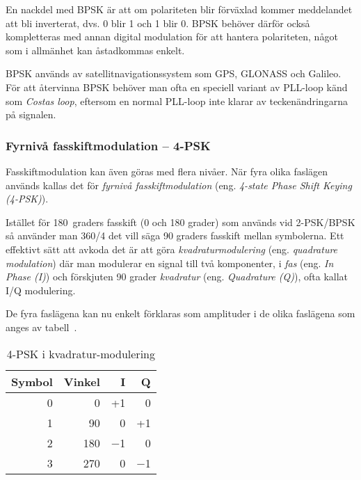 En nackdel med BPSK är att om polariteten blir förväxlad kommer meddelandet
att bli inverterat, dvs. 0 blir 1 och 1 blir 0.
BPSK behöver därför också kompletteras med annan digital modulation för att
hantera polariteten, något som i allmänhet kan åstadkommas enkelt.

BPSK används av satellitnavigationssystem som GPS, GLONASS och Galileo.
För att återvinna BPSK behöver man ofta en speciell variant av PLL-loop känd
som \emph{Costas loop}, eftersom en normal PLL-loop inte klarar av
teckenändringarna på signalen.

\subsubsection{Fyrnivå fasskiftmodulation -- 4-PSK}

Fasskiftmodulation kan även göras med flera nivåer. När fyra olika faslägen
används kallas det för \emph{fyrnivå fasskiftmodulation} (eng.
\emph{4-state Phase Shift Keying (4-PSK)}).

Istället för 180~graders fasskift (0 och 180 grader) som används vid 2-PSK/BPSK
så använder man 360/4 det vill säga 90 graders fasskift mellan symbolerna.
Ett effektivt sätt att avkoda det är att göra \emph{kvadraturmodulering}
(eng. \emph{quadrature modulation}) där man modulerar en signal till två
komponenter, i \emph{fas} (eng. \emph{In Phase (I)}) och förskjuten 90 grader \emph{kvadratur} (eng.
\emph{Quadrature (Q)}), ofta kallat I/Q modulering.

De fyra faslägena kan nu enkelt förklaras som amplituder i de olika faslägena
som anges av tabell~.

\begin{table}[t]
\begin{center}
\begin{tabular}{|r|r|r|r|}
\hline
Symbol & Vinkel & I & Q \\ \hline
0 &   0 & +1       &  0 \\
1 &  90 &  0       & +1 \\
2 & 180 & \num{-1} &  0 \\
3 & 270 &  0       & \num{-1} \\ \hline
\end{tabular}
\end{center}
\caption{4-PSK i kvadratur-modulering}
\label{tab:4-PSK}
\end{table}

